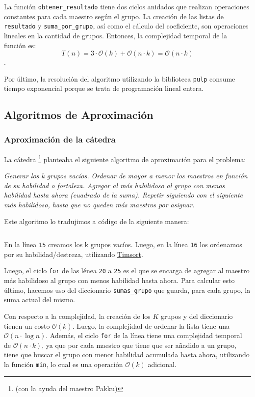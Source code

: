 \documentclass{article}
\begin{document}
La función \texttt{obtener\_resultado} tiene dos ciclos anidados que realizan operaciones constantes para cada maestro según el grupo. La creación de las listas de \texttt{resultado} y \texttt{suma\_por\_grupo}, así como el cálculo del coeficiente, son operaciones lineales en la cantidad de grupos. Entonces, la complejidad temporal de la función es:
$$T(n) = 3 \cdot \mathcal{O}(k) + \mathcal{O}(n \cdot k) = \mathcal{O}(n \cdot k)$$.

Por último, la resolución del algoritmo utilizando la biblioteca \texttt{pulp} consume tiempo exponencial porque se trata de programación lineal entera.

\subsection{Algoritmos de Aproximación}
\subsubsection{Aproximación de la cátedra}
\label{sec:algoAproxCatedra}

La cátedra \footnote{(con la ayuda del maestro Pakku)} planteaba el siguiente algoritmo de aproximación para el problema:

\textit{Generar los k grupos vacíos. Ordenar de mayor a menor los maestros en función de su habilidad o fortaleza. Agregar al más habilidoso al grupo con menos habilidad hasta ahora (cuadrado de la suma). Repetir siguiendo con el siguiente más habilidoso, hasta que no queden más maestros por asignar.}

Este algoritmo lo tradujimos a código de la siguiente manera:

\inputminted[linenos, firstline=3, lastline=29]{python}{codigo/aproximacion_catedra.py}

En la línea \texttt{15} creamos los k grupos vacíos. Luego, en la línea \texttt{16} los ordenamos por su habilidad/destreza, utilizando \href{https://svn.python.org/projects/python/trunk/Objects/listsort.txt}{Timsort}.

Luego, el ciclo \texttt{for} de las lénea \texttt{20} a \texttt{25} es el que se encarga de agregar al maestro más habilidoso al grupo con menos habilidad hasta ahora. Para calcular esto último, hacemos uso del diccionario \texttt{sumas\_grupo} que guarda, para cada grupo, la suma actual del mismo. 

Con respecto a la complejidad, la creación de los $K$ grupos y del diccionario tienen un costo $\mathcal{O}(k)$. Luego, la complejidad de ordenar la lista tiene una  $\mathcal{O}(n \cdot \log n)$.
Además, el ciclo \texttt{for} de la línea tiene  una complejidad temporal de $\mathcal{O}(n \cdot k)$, ya que por cada maestro que tiene que ser añadido a un grupo, tiene que buscar el grupo con menor habilidad acumulada hasta ahora, utilizando la función \texttt{min}, lo cual es una operación $\mathcal{O}(k)$ adicional. 
\end{document}

